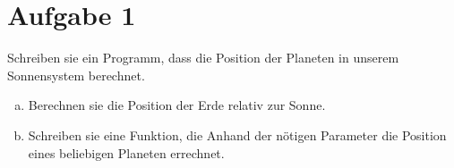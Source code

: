 \documentclass{standalone}
\begin{document}
\section{Aufgabe 1}
    Schreiben sie ein Programm, dass die Position der Planeten in unserem Sonnensystem berechnet.

\begin{enumerate}[a)]
\item
    Berechnen sie die Position der Erde relativ zur Sonne.

\item
    Schreiben sie eine Funktion, die Anhand der nötigen Parameter die Position eines beliebigen Planeten errechnet.

\end{enumerate}
\end{document}
